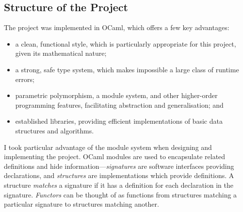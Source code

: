 \documentclass[12pt,a4paper,twoside,openright]{report}
\begin{document}
\subsection{Structure of the Project}
The project was implemented in OCaml, which
offers a few key advantages:
\begin{itemize}
	\item a clean, functional
	style, which is particularly appropriate for
	this project, given its mathematical nature;
	\item a strong, safe type system, which makes
	impossible a large class of runtime errors;
	\item parametric polymorphism, a module system,
	and other higher-order programming features,
	facilitating abstraction and generalisation; and
	\item established libraries, providing efficient
	implementations of basic data structures and algorithms.
\end{itemize}
I took particular advantage of the module system when
designing and implementing the project. OCaml modules
are used to encapsulate related definitions and hide
information---\emph{signatures} are software interfaces
providing declarations,
and \emph{structures} are implementations which 
provide definitions. A structure \emph{matches} a
signature if it has a definition for each declaration
in the signature. \emph{Functors} can be thought of
as functions from structures matching a
particular signature to structures matching another.
\end{document}
